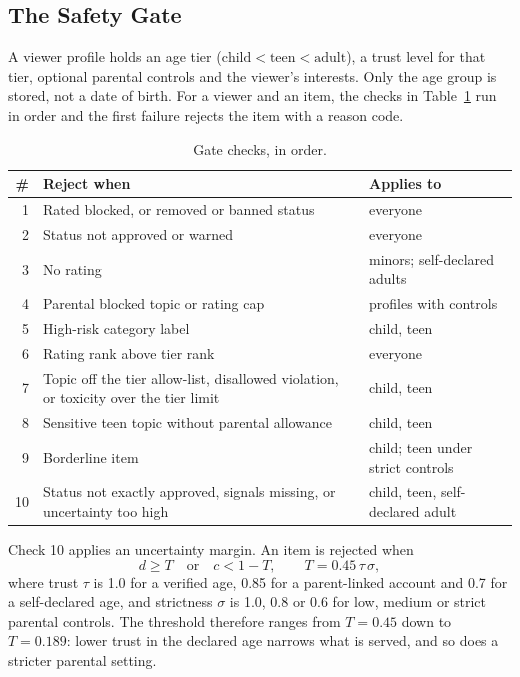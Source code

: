 \documentclass[conference]{IEEEtran}
\begin{document}
\subsection{The Safety Gate}

A viewer profile holds an age tier ($\text{child} < \text{teen} < \text{adult}$), a trust level for that tier, optional parental controls and the viewer's interests. Only the age group is stored, not a date of birth. For a viewer and an item, the checks in Table~\ref{tab:gate} run in order and the first failure rejects the item with a reason code.

\begin{table}[t]
\caption{Gate checks, in order.}
\label{tab:gate}
\centering
\footnotesize
\begin{tabular}{@{}rp{}p{}@{}}
\toprule
\# & Reject when & Applies to \\
\midrule
1 & Rated blocked, or removed or banned status & everyone \\
2 & Status not approved or warned & everyone \\
3 & No rating & minors; self-declared adults \\
4 & Parental blocked topic or rating cap & profiles with controls \\
5 & High-risk category label & child, teen \\
6 & Rating rank above tier rank & everyone \\
7 & Topic off the tier allow-list, disallowed violation, or toxicity over the tier limit & child, teen \\
8 & Sensitive teen topic without parental allowance & child, teen \\
9 & Borderline item & child; teen under strict controls \\
10 & Status not exactly approved, signals missing, or uncertainty too high & child, teen, self-declared adult \\
\bottomrule
\end{tabular}
\end{table}

Check 10 applies an uncertainty margin. An item is rejected when
\begin{equation}
d \ge T \quad \text{or} \quad c < 1 - T, \qquad T = 0.45 \, \tau \, \sigma ,
\label{eq:margin}
\end{equation}
where trust $\tau$ is 1.0 for a verified age, 0.85 for a parent-linked account and 0.7 for a self-declared age, and strictness $\sigma$ is 1.0, 0.8 or 0.6 for low, medium or strict parental controls. The threshold therefore ranges from $T = 0.45$ down to $T = 0.189$: lower trust in the declared age narrows what is served, and so does a stricter parental setting.
\end{document}
